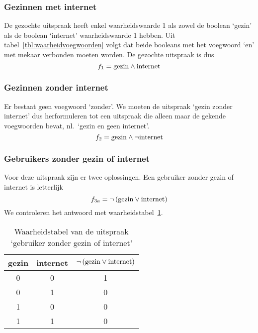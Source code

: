 \subsubsection{Gezinnen met internet}
De gezochte uitspraak heeft enkel waarheidswaarde 1 als zowel de boolean `gezin' als de boolean `internet' waarheidswaarde 1 hebben. Uit tabel~\ref{tbl:waarheidvoegwoorden} volgt dat beide booleans met het voegwoord `en' met mekaar verbonden moeten worden. De gezochte uitspraak is dus
\[
f_1=\mathrm{gezin}\wedge\mathrm{internet}
\]

\subsubsection{Gezinnen zonder internet}
Er bestaat geen voegwoord `zonder'. We moeten de uitspraak `gezin zonder internet' dus herformuleren tot een uitspraak die alleen maar de gekende voegwoorden bevat, nl.\ `gezin en geen internet'. 
\[
f_2=\mathrm{gezin}\wedge\neg \mathrm{internet}
\]

\subsubsection{Gebruikers zonder gezin of internet}
Voor deze uitspraak zijn er twee oplossingen. Een gebruiker zonder gezin of internet is letterlijk
\[
f_{3a}=\neg\left(\mathrm{gezin}\vee\mathrm{internet}\right)
\]
We controleren het antwoord met waarheidstabel~\ref{tbl:gzi}. 
\begin{table}
\caption{Waarheidstabel van de uitspraak `gebruiker zonder gezin of internet'}
\label{tbl:gzi}
\centering
\begin{tabular}{ccc}
\toprule
gezin&internet&$\neg\left(\mathrm{gezin}\vee\mathrm{internet}\right)$\\
\midrule
0&0&1\\
0&1&0\\
1&0&0\\
1&1&0\\
\bottomrule
\end{tabular}
\end{table}

